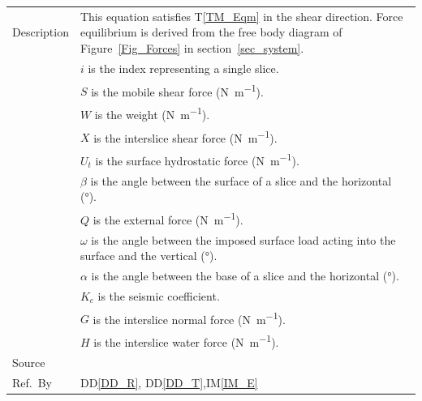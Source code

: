 \documentclass[12pt]{article}
\newcommand{\colAwidth}{0.13\textwidth}
\newcommand{\colBwidth}{0.82\textwidth}
\newcommand{\tref}[1]{T\ref{#1}}
\newcommand{\iref}[1]{IM\ref{#1}}
\newcommand{\ddref}[1]{DD\ref{#1}}
\begin{document}
\begin{minipage}{\textwidth}
\begin{tabular}{| p{\colAwidth} | p{\colBwidth}|}
  \hline Description & This equation satisfies \tref{TM_Eqm} in the shear 
  direction. Force equilibrium is derived from the free body diagram of 
  Figure~\ref{Fig_Forces} in section~\ref{sec_system}.\\
  &$i$ is the index representing a single slice.\\
  &$S$ is the mobile shear force (\si{\newton\per\meter}). \\
  &$W$ is the weight (\si{\newton\per\meter}). \\
  &$X$ is the interslice shear force (\si{\newton\per\meter}). \\
  &$U_t$ is the surface hydrostatic force (\si{\newton\per\meter}). \\
  &$\beta$ is the angle between the surface of a slice and the 
  horizontal (\si{\degree}). \\
  &$Q$ is the external force (\si{\newton\per\meter}). \\
  &$\omega$ is the angle between the imposed surface load acting into 
  the surface and the vertical (\si{\degree}). \\
  &$\alpha$ is the angle between the base of a slice and the 
  horizontal (\si{\degree}). \\
  &$K_c$ is the seismic coefficient. \\
  &$G$ is the interslice normal force (\si{\newton\per\meter}). \\
  &$H$ is the interslice water force (\si{\newton\per\meter}). \\

  \hline Source & \cite{ZhuEtAl2005}\\
  
  \hline Ref.\ By & \ddref{DD_R}, \ddref{DD_T},\iref{IM_E}\\
  
  \hline
\end{tabular}
\end{minipage}\\

~\newline
\end{document}

